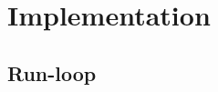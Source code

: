 \documentclass[ 
xcolor={usenames,dvipsnames,svgnames,tablem} 
,handout
]{beamer}
\begin{document}


\section{Implementation}
\subsection{Run-loop}

\end{document}
